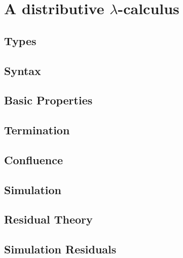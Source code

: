 \chapter{A distributive $\lambda$-calculus}

\section{Types}

\section{Syntax}

\section{Basic Properties}

\section{Termination}

\section{Confluence}

\section{Simulation}

\section{Residual Theory}

\section{Simulation Residuals}

